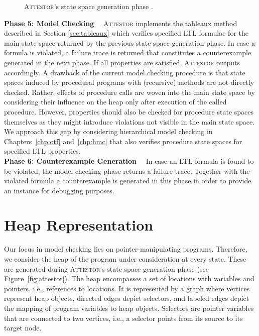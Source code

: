 \documentclass[a4paper, 12pt, twoside]{report}
\begin{document}
\begin{figure}
\begin{center}
{}
			\caption{\textsc{Attestor}'s state space generation phase \cite{arndt2018let}.}\label{fig:stateSpaceGeneration}
		\end{center}
	\end{figure}
	
	\textbf{Phase 5: Model Checking$\quad$}
	\textsc{Attestor} implements the tableaux method described in Section \ref{sec:tableaux} which verifies specified LTL formulae for the main state space returned by the previous state space generation phase. In case a formula is violated, a failure trace is returned that constitutes a counterexample generated in the next phase. If all properties are satisfied, \textsc{Attestor} outputs accordingly. A drawback of the current model checking procedure is that state spaces induced by procedural programs with (recursive) methods are not directly checked. Rather, effects of procedure calls are woven into the main state space by considering their influence on the heap only after execution of the called procedure. However, properties should also be checked for procedure state spaces themselves as they might introduce violations not visible in the main state space. We approach this gap by considering hierarchical model checking in Chapters~\ref{chp:otf} and~\ref{chp:hmc} that also verifies procedure state spaces for specified LTL properties.\\
	
	\textbf{Phase 6: Counterexample Generation$\quad$}
	In case an LTL formula is found to be violated, the model checking phase returns a failure trace. Together with the violated formula a counterexample is generated in this phase in order to provide an instance for debugging purposes.
	
	\section{Heap Representation}\label{sec:heap}	
	
	Our focus in model checking lies on pointer-manipulating programs. Therefore, we consider the heap of the program under consideration at every state. These are generated during \textsc{Attestor}'s state space generation phase (see Figure~\ref{fig:attestor}). The heap encompasses a set of locations with variables and pointers, i.e., references to locations. It is represented by a graph where vertices represent heap objects, directed edges depict selectors, and labeled edges depict the mapping of program variables to heap objects. Selectors are pointer variables that are connected to two vertices, i.e., a selector points from its source to its target node.\\
	
\end{document}
